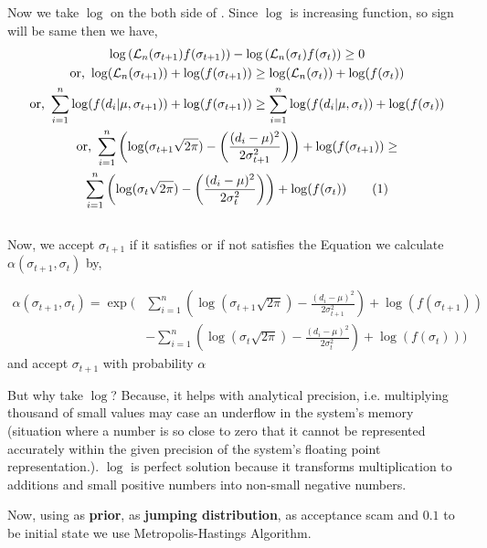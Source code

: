 \begin{example}
	Now we take $ \log $ on the both side of . Since $ \log $ is increasing function, so sign will be same then we have,
	\begin{gather*}
		\log \left(  \mathcal{L}_n(\sigma_{t+1})f(\sigma_{t+1}) \right) - \log \left(  \mathcal{L}_n(\sigma_{t})f(\sigma_{t})\right) \ge 0 \\
		\text{or, } \log( \mathcal{L}_n(\sigma_{t+1}) ) + \log(f(\sigma_{t+1})) \ge \log(\mathcal{L}_n(\sigma_t)) + \log(f(\sigma_t)) \\
		\text{or, } \sum_{i=1}^n \log(f(d_i|\mu,\sigma_{t+1})) + \log(f(\sigma_{t+1}))  \ge \sum_{i = 1}^{n} \log(f(d_i|\mu,\sigma_t)) + \log (f(\sigma_t))\\
		\text{or, } \sum_{i = 1}^{n} \left( \log(\sigma_{t+1}\sqrt{2 \pi}) - \left( \frac{(d_i - \mu)^2}{2 \sigma_{t+1}^2} \right) \right) + \log(f(\sigma_{t+1})) \ge \\ \sum_{i = 1}^{n} \left( \log(\sigma_{t}\sqrt{2 \pi}) - \left( \frac{(d_i - \mu)^2}{2 \sigma_{t}^2} \right) \right) + \log(f(\sigma_{t})) \label{eq:2nd accept mh example2} \numberthis
	\end{gather*} \\
	Now, we accept $ \sigma_{t+1} $ if it satisfies  or if not satisfies the Equation we calculate $ \alpha(\sigma_{t+1},\sigma_t) $ by,

	\begin{align*}
		\alpha(\sigma_{t+1}, \sigma_t) = \exp \bigg( & \sum_{i=1}^{n} \left( \log(\sigma_{t+1} \sqrt{2 \pi}) - \frac{(d_i - \mu)^2}{2 \sigma_{t+1}^2} \right) + \log(f(\sigma_{t+1})) \\
		                                             & - \sum_{i=1}^{n} \left( \log(\sigma_t \sqrt{2 \pi}) - \frac{(d_i - \mu)^2}{2 \sigma_t^2} \right) + \log(f(\sigma_t)) \bigg)
	\end{align*}
	and accept $ \sigma_{t+1} $ with probability $ \alpha $

	But why take $ \log $? Because, it helps with analytical precision, i.e. multiplying thousand of small values may case an underflow in the system's memory (situation where a number is so close to zero that it cannot be represented accurately within the given precision of the system's floating point representation.). $ \log $ is perfect solution because it transforms multiplication to additions and small positive numbers into non-small negative numbers.

	Now, using  as \textbf{prior},  as \textbf{jumping distribution},  as acceptance scam and $0.1$ to be initial state we use Metropolis-Hastings Algorithm.


\end{example}
